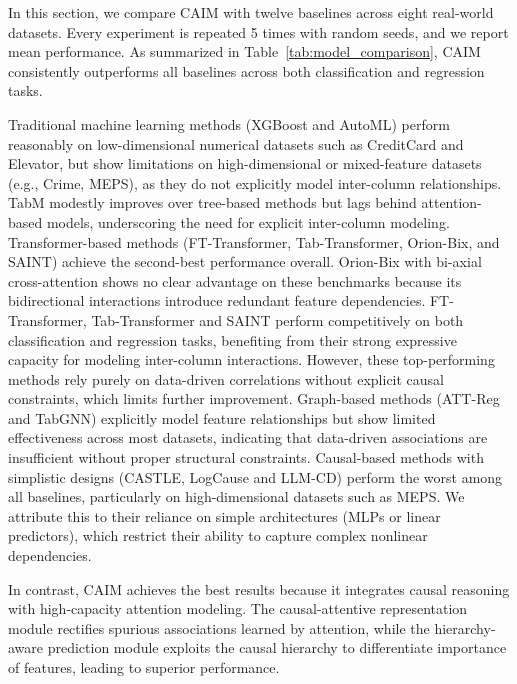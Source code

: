 \documentclass[sigconf, nonacm]{acmart}
\newcommand{\icde}[1]{{\color{black}#1}}
\newcommand{\done}[1]{{\color{black}#1}}
\newcommand{\rln}[1]{{\color{black}#1}}
\newcommand{\sydesi}[1]{{\color{black}#1}}
\newcommand{\sytwo}[1]{{\color{black}#1}}
\newcommand{\syadd}[1]{{\color{black}#1}}
\newcommand{\syfix}[1]{{\color{black}#1}}
\newcommand{\syne}[1]{{\color{black}#1}}
\newcommand*{\ourmodel}{CAIM}
\begin{document}
\rln{In this section, we compare \ourmodel{} with \syfix{twelve} baselines across eight real-world datasets. }
\icde{Every experiment is repeated 5 times with random seeds, and we report mean performance.}
As summarized in Table~\ref{tab:model_comparison}, \ourmodel{} consistently outperforms all baselines across both classification and regression tasks.

\rln{
Traditional machine learning methods (XGBoost and AutoML) perform reasonably on low-dimensional numerical datasets such as CreditCard and Elevator, but show limitations on high-dimensional or mixed-feature datasets (e.g., Crime, MEPS), as they do not explicitly model \sydesi{inter-column relationships}.
\syne{TabM modestly improves over tree-based methods but lags behind attention-based models, underscoring the need for explicit inter-column modeling.} 
\sytwo{Transformer-based methods (FT-Transformer, Tab-Transformer, \syfix{Orion-Bix,} and SAINT) achieve the second-best performance overall. 
\syfix{
Orion-Bix with bi-axial cross-attention shows no clear advantage on these benchmarks because its bidirectional interactions introduce redundant feature dependencies.
} 
FT-Transformer, Tab-Transformer and SAINT perform competitively on both classification and regression tasks, benefiting from their strong expressive capacity for modeling inter-column interactions. 
However, these top-performing methods rely purely on data-driven correlations without explicit causal constraints, which limits further improvement.
Graph-based methods (ATT-Reg and TabGNN) explicitly model feature relationships but show \sydesi{limited effectiveness} across most datasets, indicating that \sydesi{data-driven associations are} insufficient without proper structural constraints.
\syfix{Causal-based methods with simplistic designs (CASTLE, LogCause \syfix{and LLM-CD}) perform the worst among all baselines, } particularly on high-dimensional datasets such as MEPS.
We attribute this to their reliance on simple \sydesi{architectures} (MLPs or linear predictors), which \syne{restrict} their ability to capture complex nonlinear dependencies.}

\icde{
In contrast, \ourmodel{} achieves the best results because it integrates causal reasoning with high‑capacity attention modeling.
}
The causal-attentive representation module rectifies spurious associations learned by attention, while the hierarchy-aware prediction module exploits the causal hierarchy to \sydesi{differentiate importance of features}, leading to superior performance.
}
\end{document}
